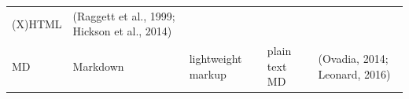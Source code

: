 \documentclass[10pt,fleqn]{wlpeerj}
\begin{document}
\begin{longtable}[c]{@{}lllll@{}}
\begin{minipage}[t]{0.09\columnwidth}
(X)HTML
\strut\end{minipage} &
\begin{minipage}[t]{0.40\columnwidth}\raggedright\strut
(Raggett et al., 1999; Hickson et al., 2014)
\strut\end{minipage}\tabularnewline
\begin{minipage}[t]{0.06\columnwidth}\raggedright\strut
MD
\strut\end{minipage} &
\begin{minipage}[t]{0.18\columnwidth}\raggedright\strut
Markdown
\strut\end{minipage} &
\begin{minipage}[t]{0.13\columnwidth}\raggedright\strut
lightweight markup
\strut\end{minipage} &
\begin{minipage}[t]{0.09\columnwidth}\raggedright\strut
plain text MD
\strut\end{minipage} &
\begin{minipage}[t]{0.40\columnwidth}\raggedright\strut
(Ovadia, 2014; Leonard, 2016)
\strut\end{minipage}\tabularnewline
\bottomrule
\end{longtable}
\end{document}
